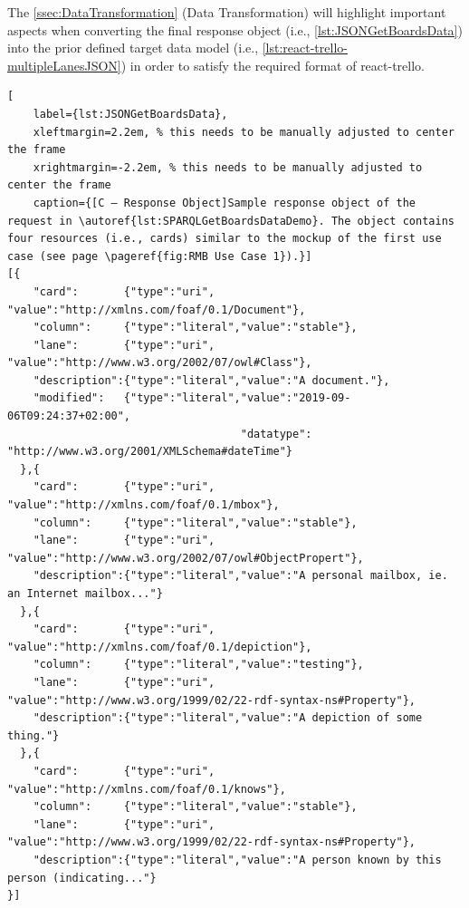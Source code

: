 The \autoref{ssec:DataTransformation} (Data Transformation) will highlight important aspects when converting the final response object (i.e., \autoref{lst:JSONGetBoardsData}) into the prior defined target data model (i.e., \autoref{lst:react-trello-multipleLanesJSON}) in order to satisfy the required format of react-trello.


\begin{spacing}{0.9}
    \lstset{language=JavaScript,escapechar=|}
    \begin{lstlisting}[
    label={lst:JSONGetBoardsData},
    xleftmargin=2.2em, % this needs to be manually adjusted to center the frame
    xrightmargin=-2.2em, % this needs to be manually adjusted to center the frame
    caption={[C — Response Object]Sample response object of the request in \autoref{lst:SPARQLGetBoardsDataDemo}. The object contains four resources (i.e., cards) similar to the mockup of the first use case (see page \pageref{fig:RMB Use Case 1}).}]
[{
    "card":       {"type":"uri",    "value":"http://xmlns.com/foaf/0.1/Document"},
    "column":     {"type":"literal","value":"stable"},
    "lane":       {"type":"uri",    "value":"http://www.w3.org/2002/07/owl#Class"},
    "description":{"type":"literal","value":"A document."},
    "modified":   {"type":"literal","value":"2019-09-06T09:24:37+02:00",
                                    "datatype": "http://www.w3.org/2001/XMLSchema#dateTime"}
  },{
    "card":       {"type":"uri",    "value":"http://xmlns.com/foaf/0.1/mbox"},
    "column":     {"type":"literal","value":"stable"},
    "lane":       {"type":"uri",    "value":"http://www.w3.org/2002/07/owl#ObjectPropert"},
    "description":{"type":"literal","value":"A personal mailbox, ie. an Internet mailbox..."}
  },{
    "card":       {"type":"uri",    "value":"http://xmlns.com/foaf/0.1/depiction"},
    "column":     {"type":"literal","value":"testing"},
    "lane":       {"type":"uri",    "value":"http://www.w3.org/1999/02/22-rdf-syntax-ns#Property"},
    "description":{"type":"literal","value":"A depiction of some thing."}
  },{
    "card":       {"type":"uri",    "value":"http://xmlns.com/foaf/0.1/knows"},
    "column":     {"type":"literal","value":"stable"},
    "lane":       {"type":"uri",    "value":"http://www.w3.org/1999/02/22-rdf-syntax-ns#Property"},
    "description":{"type":"literal","value":"A person known by this person (indicating..."}
}]
\end{lstlisting}
\end{spacing}



